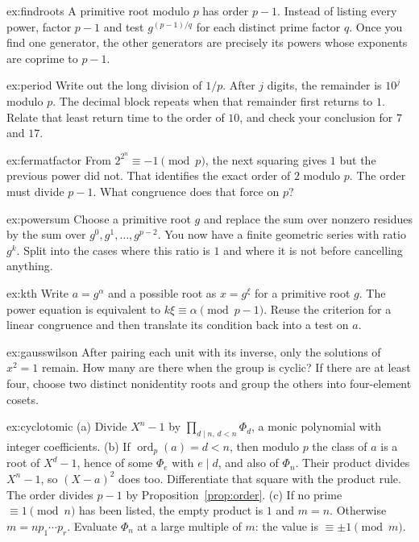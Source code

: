 \begin{hint}{ex:findroots}
A primitive root modulo $p$ has order $p-1$. Instead of listing every power, factor $p-1$ and test $g^{(p-1)/q}$ for each distinct prime factor $q$. Once you find one generator, the other generators are precisely its powers whose exponents are coprime to $p-1$.
\end{hint}
\begin{hint}{ex:period}
Write out the long division of $1/p$. After $j$ digits, the remainder is $10^j$ modulo $p$. The decimal block repeats when that remainder first returns to $1$. Relate that least return time to the order of $10$, and check your conclusion for $7$ and $17$.
\end{hint}
\begin{hint}{ex:fermatfactor}
From $2^{2^n}\equiv-1\pmod p$, the next squaring gives $1$ but the previous power did not. That identifies the exact order of $2$ modulo $p$. The order must divide $p-1$. What congruence does that force on $p$?
\end{hint}
\begin{hint}{ex:powersum}
Choose a primitive root $g$ and replace the sum over nonzero residues by the sum over $g^0,g^1,\ldots,g^{p-2}$. You now have a finite geometric series with ratio $g^k$. Split into the cases where this ratio is $1$ and where it is not before cancelling anything.
\end{hint}
\begin{hint}{ex:kth}
Write $a=g^\alpha$ and a possible root as $x=g^\xi$ for a primitive root $g$. The power equation is equivalent to $k\xi\equiv\alpha\pmod{p-1}$. Reuse the criterion for a linear congruence and then translate its condition back into a test on $a$.
\end{hint}
\begin{hint}{ex:gausswilson}
After pairing each unit with its inverse, only the solutions of $x^2=1$ remain. How many are there when the group is cyclic? If there are at least four, choose two distinct nonidentity roots and group the others into four-element cosets.
\end{hint}
\begin{hint}{ex:cyclotomic}
(a) Divide $X^n-1$ by $\prod_{d\mid n,\,d<n}\Phi_d$, a monic polynomial with integer coefficients. (b) If $\operatorname{ord}_p(a)=d<n$, then modulo $p$ the class of $a$ is a root of $X^d-1$, hence of some $\Phi_e$ with $e\mid d$, and also of $\Phi_n$. Their product divides $X^n-1$, so $(X-a)^2$ does too. Differentiate that square with the product rule. The order divides $p-1$ by Proposition~\ref{prop:order}. (c) If no prime $\equiv1\pmod n$ has been listed, the empty product is $1$ and $m=n$. Otherwise $m=np_1\cdots p_r$. Evaluate $\Phi_n$ at a large multiple of $m$: the value is $\equiv\pm1\pmod m$.
\end{hint}
